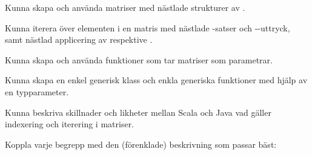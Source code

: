 

\ifPreSolution

\Exercise{\ExeWeekEIGHT}\label{exe:W08}

\begin{Goals}
\item Kunna skapa och använda matriser med nästlade strukturer av .
\item Kunna iterera över elementen i en matris med nästlade -satser och --uttryck, samt nästlad applicering av  respektive .
\item Kunna skapa och använda funktioner som tar matriser som parametrar.
\item Kunna skapa en enkel generisk klass och enkla generiska funktioner med hjälp av en typparameter.
\item Kunna beskriva skillnader och likheter mellan Scala och Java vad gäller indexering och iterering i matriser.
\end{Goals}

\begin{Preparations}
\item {}
\end{Preparations}

\BasicTasks

\else

\ExerciseSolution{\ExeWeekEIGHT}

\BasicTasks

\fi




\QUESTBEGIN

\Task \what

\vspace{1em}\noindent Koppla varje begrepp med den (förenklade) beskrivning som passar bäst:

\begin{ConceptConnections}

\end{ConceptConnections}

\SOLUTION

\TaskSolved \what

